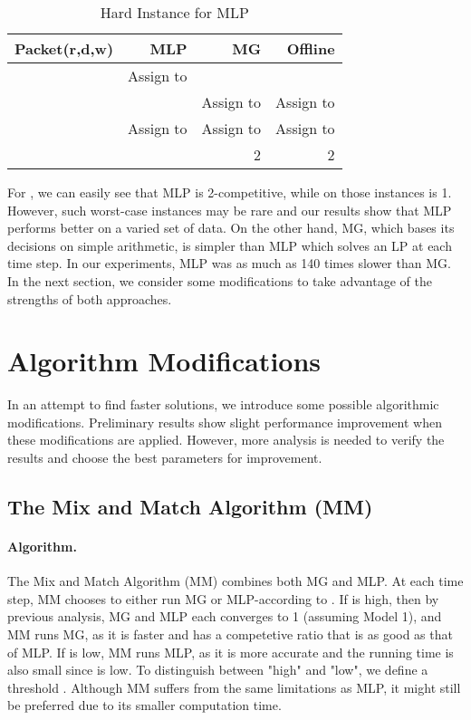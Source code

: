 \documentclass[oribibl]{llncs}
\begin{document}
\vspace{5pt}
\begin{table}[ht] \centering
 \begin{tabular}{|r||r|r|r|} 
 \hline
 Packet(r,d,w) \;\;\; & MLP \;\; & MG \;\; & Offline \;\;   \\ [0.5ex] 
 \hline\hline
  &   \;\;\; Assign to   & & \\ 
 \hline
  & & \;\;\; Assign to  &  \;\;\; Assign to  \\
 \hline
  &  \;\;\; Assign to  &  \;\;\; Assign to  &  \;\;\; Assign to \\  
 \hline
 \hline
 \;\;   & & 2 & 2\\ [1ex] 
 \hline
\end{tabular}
 \caption{Hard Instance for MLP}
 \label{HI-example}
\end{table}

\vspace{-16pt}
 For , we can easily see that MLP is 2-competitive, while
  on those instances is 1. However, such worst-case
 instances may be rare and our results show that MLP performs better
 on a varied set of data.  On the other hand, MG, which bases its decisions on
 simple arithmetic, is simpler than MLP which solves an LP at each time
 step. In our experiments, MLP was as much as 140 times slower than MG.
In the next section, we consider some modifications to take advantage
of the strengths of both approaches.




\section{Algorithm Modifications}
\label{sec:AM}


 In an attempt to find faster solutions, we introduce some possible algorithmic
 modifications. Preliminary results show slight performance improvement when these
 modifications are applied. However, more analysis is needed to verify
 the results and choose the best parameters for improvement.

\subsection {The Mix and Match Algorithm (MM)}
\label{subsec:MM}

\paragraph{Algorithm.} The Mix and Match Algorithm (MM) combines 
both MG and MLP. At each time step, MM chooses to either
run MG or MLP-according to . If  is high, then by
previous analysis, MG and MLP each converges to 1 (assuming Model
1), and MM runs MG, as it is faster and has a competetive ratio that
is as good as that of MLP. If 
is low, MM runs MLP, as it is more accurate and the running time is
also small since  is low.
To distinguish between "high" and "low", we define a
threshold . Although MM suffers from the same limitations as
MLP, it might still be preferred due to its smaller computation time. 
\end{document}
